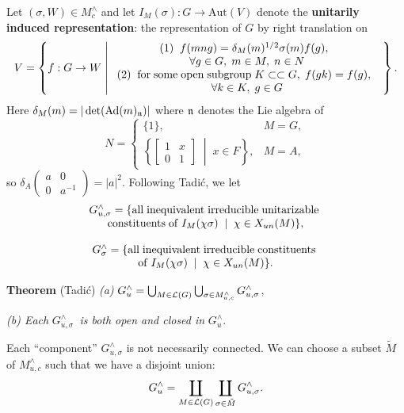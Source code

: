 \documentclass[11pt, a4paper]{article}
\begin{document}
Let $(\sigma ,W)\in M_c^{\wedge }$ and let $I_M(\sigma ):G\rightarrow \mathrm{Aut}(V)$
denote the {\bf unitarily induced representation}: the representation of $G$
by right translation on
\[
V=\left\{f:G\rightarrow W\;\middle|\; 
\begin{array}{c}
(1)\;\;f(mng)=\delta _M(m)^{1/2}\sigma (m)f(g),\;\; \\ 
\forall g\in G,\;m\in M,\;n\in N \\ 
(2)\;\;{\rm for\;some\;open\;subgroup}\;K\subset \subset G,\;f(gk)=f(g),\;\; \\ 
\forall k\in K,\;g\in G
\end{array}
\right\}.
\]
Here $\delta _M(m)=|\det (\mathrm{Ad}(m)_{{\frak n}})|$ where ${\frak n}$ denotes the
Lie algebra of
\[
N=\left\{ 
\begin{array}{ll}
\{1\}, & M=G, \\ 
\left\{\left[ 
\begin{array}{cc}
1 & x \\ 
0 & 1
\end{array}
\right] \;\middle|\;x\in F\right\}, & M=A,
\end{array}
\right.
\]
so $\delta _A\left( 
\begin{array}{cc}
a & 0 \\ 
0 & a^{-1}
\end{array}
\right)=|a|^2$. Following Tadi\'c, we let
\[
\begin{array}{c}
\begin{array}{c}
G_{u,\sigma }^{\wedge }=\{{\rm all\;inequivalent\;irreducible\;unitarizable\;%
} \\ 
{\rm constituents\;of\;}I_M(\chi \sigma )\;\;|\;\;\chi \in X_{un}(M)\},
\end{array}
\\ 
\\ 
\begin{array}{c}
G_\sigma ^{\wedge }=\{{\rm all\;inequivalent\;irreducible\;constituents\;}
\\ 
{\rm of\;}I_M(\chi \sigma )\;\;|\;\;\chi \in X_{un}(M)\}.
\end{array}
\end{array}
\]

{\bf Theorem} (Tadi\'c) {\em (a) }$G_u^{\wedge }=\bigcup_{M\in {\cal L}%
(G)}\bigcup_{\sigma \in M_{u,c}^{\wedge }}G_{u,\sigma }^{\wedge }$,

{\em (b) Each }$G_{u,\sigma }^{\wedge }${\em \ is both open and closed in }$%
G_u^{\wedge }$.

Each ``component'' $G_{u,\sigma }^{\wedge }$ is not necessarily connected.
We can choose a subset $\tilde{M}$ of $M_{u,c}^{\wedge }$ such that
we have a disjoint union:
\[
G_u^{\wedge }=\coprod_{M\in {\cal L}(G)}
\coprod_{\sigma \in \tilde{M}}G_{u,\sigma }^{\wedge }.
\]
\end{document}
